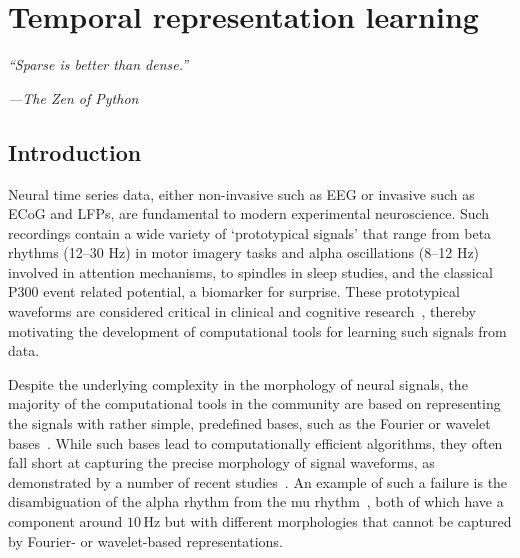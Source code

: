 \chapter{Temporal representation learning}
\label{chapter:alphacsc}

\epigraph{\small\itshape \hspace{100pt} ``Sparse is better than dense.''}{\small\textit{---The Zen of Python}}


\noindent{}%

\section{Introduction}
\label{sec:alphacsc_intro}
Neural time series data, either non-invasive such as \ac{EEG} 
or invasive such as \ac{ECoG} and \acp{LFP}, are fundamental to modern experimental neuroscience. Such recordings contain a wide variety of `prototypical signals' that range from beta rhythms (12--30 Hz) in motor imagery tasks and alpha oscillations (8--12 Hz) involved in attention mechanisms, to spindles in sleep studies, 
and the classical P300 event related potential, a biomarker for surprise. 
%
These prototypical waveforms are considered critical in clinical and cognitive research~\citep{cole2017brain}, thereby motivating the development of computational tools for learning such signals from data.


Despite the underlying complexity in the morphology of neural signals, the majority of the computational tools in the community are based on representing the signals with rather simple, predefined bases, such as the Fourier or wavelet bases~\citep{cohen2014analyzing}.
While such bases lead to computationally efficient algorithms, they often fall short at capturing the precise morphology of signal waveforms, as demonstrated by a number of recent studies~\citep{jones2016brain,mazaheri2008asymmetric}. An example of such a failure is the disambiguation of the alpha rhythm from the mu rhythm~\citep{hari2017meg}, both of which have a component around $10$\,Hz but with different morphologies that cannot be captured by Fourier- or wavelet-based representations.

